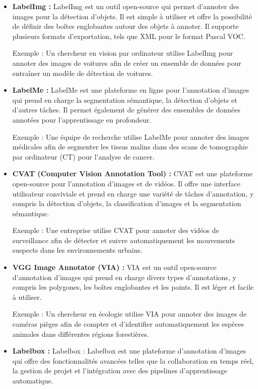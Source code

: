 \documentclass{article}
\begin{document}
	\begin{itemize}
		\item \textbf{LabelImg : }LabelImg est un outil open-source qui permet d'annoter des images pour la détection d'objets. Il est simple à utiliser et offre la possibilité de définir des boîtes englobantes autour des objets à annoter. Il supporte plusieurs formats d'exportation, tels que XML pour le format Pascal VOC.
		
		Exemple : Un chercheur en vision par ordinateur utilise LabelImg pour annoter des images de voitures afin de créer un ensemble de données pour entraîner un modèle de détection de voitures.
		\item \textbf{LabelMe : }LabelMe est une plateforme en ligne pour l'annotation d'images qui prend en charge la segmentation sémantique, la détection d'objets et d'autres tâches. Il permet également de générer des ensembles de données annotées pour l'apprentissage en profondeur.
		
		Exemple : Une équipe de recherche utilise LabelMe pour annoter des images médicales afin de segmenter les tissus malins dans des scans de tomographie par ordinateur (CT) pour l'analyse de cancer.
		
		\item \textbf{CVAT (Computer Vision Annotation Tool) : }CVAT est une plateforme open-source pour l'annotation d'images et de vidéos. Il offre une interface utilisateur conviviale et prend en charge une variété de tâches d'annotation, y compris la détection d'objets, la classification d'images et la segmentation sémantique.
		
		Exemple : Une entreprise utilise CVAT pour annoter des vidéos de surveillance afin de détecter et suivre automatiquement les mouvements suspects dans les environnements urbains.
		
		\item \textbf{VGG Image Annotator (VIA) : }VIA est un outil open-source d'annotation d'images qui prend en charge divers types d'annotations, y compris les polygones, les boîtes englobantes et les points. Il est léger et facile à utiliser.
		
		Exemple : Un chercheur en écologie utilise VIA pour annoter des images de caméras pièges afin de compter et d'identifier automatiquement les espèces animales dans différentes régions forestières. 
		
		\item \textbf{Labelbox : }Labelbox : Labelbox est une plateforme d'annotation d'images qui offre des fonctionnalités avancées telles que la collaboration en temps réel, la gestion de projet et l'intégration avec des pipelines d'apprentissage automatique.
		

\end{itemize}
\end{document}
